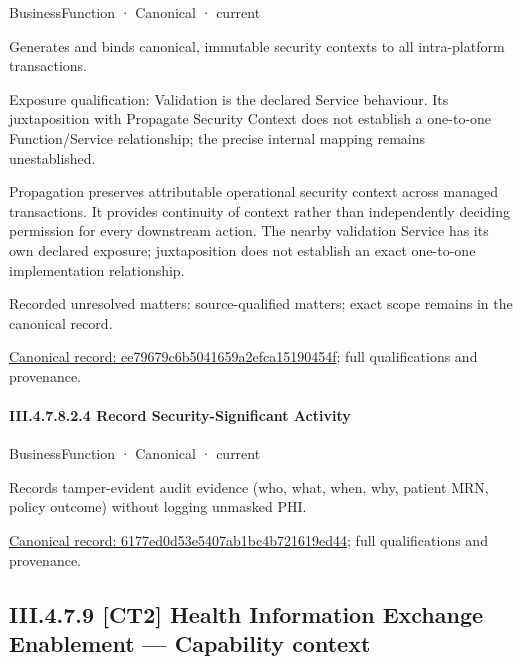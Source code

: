 \label{element:ee79679c6b5041659a2efca15190454f}
{\small BusinessFunction · Canonical · current}\par

Generates and binds canonical, immutable security contexts to all intra-platform transactions.



Exposure qualification: Validation is the declared Service behaviour. Its juxtaposition with Propagate Security Context does not establish a one-to-one Function/Service relationship; the precise internal mapping remains unestablished.



Propagation preserves attributable operational security context across managed transactions. It provides continuity of context rather than independently deciding permission for every downstream action. The nearby validation Service has its own declared exposure; juxtaposition does not establish an exact one-to-one implementation relationship.


{\small Recorded unresolved matters: source-qualified matters; exact scope remains in the canonical record.}\par
{\footnotesize \href{../../../../../../../continuum/business/business-function/ee79679c6b5041659a2efca15190454f.md}{Canonical record: ee79679c6b5041659a2efca15190454f}; full qualifications and provenance.}\par
\paragraph*{III.4.7.8.2.4 Record Security-Significant Activity}
\label{navigation:III.4.7.8.2.4}

\label{element:6177ed0d53e5407ab1bc4b721619ed44}
{\small BusinessFunction · Canonical · current}\par

Records tamper-evident audit evidence (who, what, when, why, patient MRN, policy outcome) without logging unmasked PHI.


{\footnotesize \href{../../../../../../../continuum/business/business-function/6177ed0d53e5407ab1bc4b721619ed44.md}{Canonical record: 6177ed0d53e5407ab1bc4b721619ed44}; full qualifications and provenance.}\par
\subsection*{III.4.7.9 [CT2] Health Information Exchange Enablement — Capability context}
\label{navigation:III.4.7.9}

